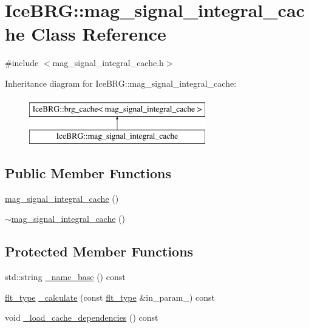 \hypertarget{classIceBRG_1_1mag__signal__integral__cache}{\section{Ice\-B\-R\-G\-:\-:mag\-\_\-signal\-\_\-integral\-\_\-cache Class Reference}
\label{classIceBRG_1_1mag__signal__integral__cache}
}


{\ttfamily \#include $<$mag\-\_\-signal\-\_\-integral\-\_\-cache.\-h$>$}

Inheritance diagram for Ice\-B\-R\-G\-:\-:mag\-\_\-signal\-\_\-integral\-\_\-cache\-:\begin{figure}[H]
\begin{center}
\leavevmode
\includegraphics[height=2.000000cm]{classIceBRG_1_1mag__signal__integral__cache}
\end{center}
\end{figure}
\subsection*{Public Member Functions}
\begin{DoxyCompactItemize}
\item 
\hyperlink{classIceBRG_1_1mag__signal__integral__cache_afa83d06fc1f822daa7090672932a2628}{mag\-\_\-signal\-\_\-integral\-\_\-cache} ()
\item 
\hyperlink{classIceBRG_1_1mag__signal__integral__cache_a7b9e8bef6cf4be45d2433d1d67456935}{$\sim$mag\-\_\-signal\-\_\-integral\-\_\-cache} ()
\end{DoxyCompactItemize}
\subsection*{Protected Member Functions}
\begin{DoxyCompactItemize}
\item 
std\-::string \hyperlink{classIceBRG_1_1mag__signal__integral__cache_a0fba2d585686eeb7df8ad63a12467286}{\-\_\-name\-\_\-base} () const 
\item 
\hyperlink{lib_2IceBRG__main_2common_8h_ad0f130a56eeb944d9ef2692ee881ecc4}{flt\-\_\-type} \hyperlink{classIceBRG_1_1mag__signal__integral__cache_a580ab95b1c68dab69c368bf5bda1f741}{\-\_\-calculate} (const \hyperlink{lib_2IceBRG__main_2common_8h_ad0f130a56eeb944d9ef2692ee881ecc4}{flt\-\_\-type} \&in\-\_\-param\-\_) const 
\item 
void \hyperlink{classIceBRG_1_1mag__signal__integral__cache_a9f027f5fd56a5997d374586c0a035b4c}{\-\_\-load\-\_\-cache\-\_\-dependencies} () const 
\end{DoxyCompactItemize}
